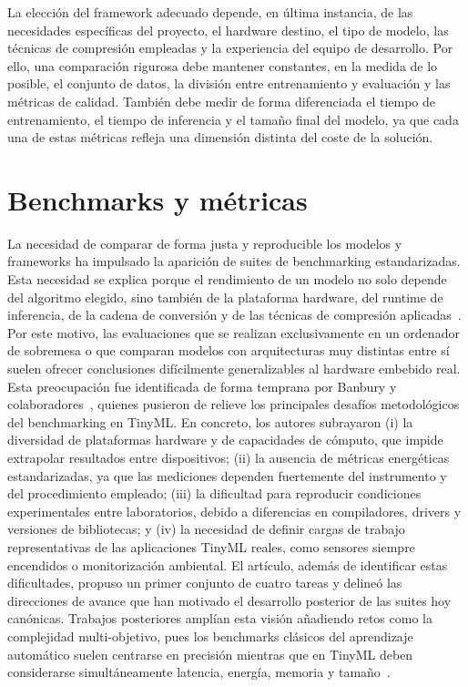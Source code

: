 \documentclass[a4paper,12pt,twoside,final]{book}
\begin{document}
La elección del framework adecuado depende, en última instancia, de las necesidades específicas del proyecto, el
hardware destino, el tipo de modelo, las técnicas de compresión empleadas y la experiencia del equipo de desarrollo.
Por ello, una comparación rigurosa debe mantener constantes, en la medida de lo posible, el conjunto de datos, la
división entre entrenamiento y evaluación y las métricas de calidad. También debe medir de forma diferenciada el
tiempo de entrenamiento, el tiempo de inferencia y el tamaño final del modelo, ya que cada una de estas métricas
refleja una dimensión distinta del coste de la solución.

\section{Benchmarks y métricas}
La necesidad de comparar de forma justa y reproducible los modelos y frameworks ha impulsado la aparición de suites
de benchmarking estandarizadas. Esta necesidad se explica porque el rendimiento de un modelo no solo depende del
algoritmo elegido, sino también de la plataforma hardware, del runtime de inferencia, de la cadena de conversión y
de las técnicas de compresión aplicadas~\cite{somvanshi2025acm}. Por este motivo, las evaluaciones que se realizan
exclusivamente en un ordenador de sobremesa o que comparan modelos con arquitecturas muy distintas entre sí suelen
ofrecer conclusiones difícilmente generalizables al hardware embebido real.\\

Esta preocupación fue identificada de forma temprana por Banbury y colaboradores~\cite{banbury2020benchmarking},
quienes pusieron de relieve los principales desafíos metodológicos del benchmarking en TinyML. En concreto, los
autores subrayaron (i) la diversidad de plataformas hardware y de capacidades de cómputo, que impide extrapolar
resultados entre dispositivos; (ii) la ausencia de métricas energéticas estandarizadas, ya que las mediciones
dependen fuertemente del instrumento y del procedimiento empleado; (iii) la dificultad para reproducir condiciones
experimentales entre laboratorios, debido a diferencias en compiladores, drivers y versiones de bibliotecas; y
(iv) la necesidad de definir cargas de trabajo representativas de las aplicaciones TinyML reales, como sensores
siempre encendidos o monitorización ambiental. El artículo, además de identificar estas dificultades, propuso un
primer conjunto de cuatro tareas y delineó las direcciones de avance que han motivado el desarrollo posterior de las
suites hoy canónicas. Trabajos posteriores amplían esta visión añadiendo retos como la complejidad multi-objetivo,
pues los benchmarks clásicos del aprendizaje automático suelen centrarse en precisión mientras que en TinyML deben
considerarse simultáneamente latencia, energía, memoria y tamaño~\cite{somvanshi2025acm}.\\
\end{document}
